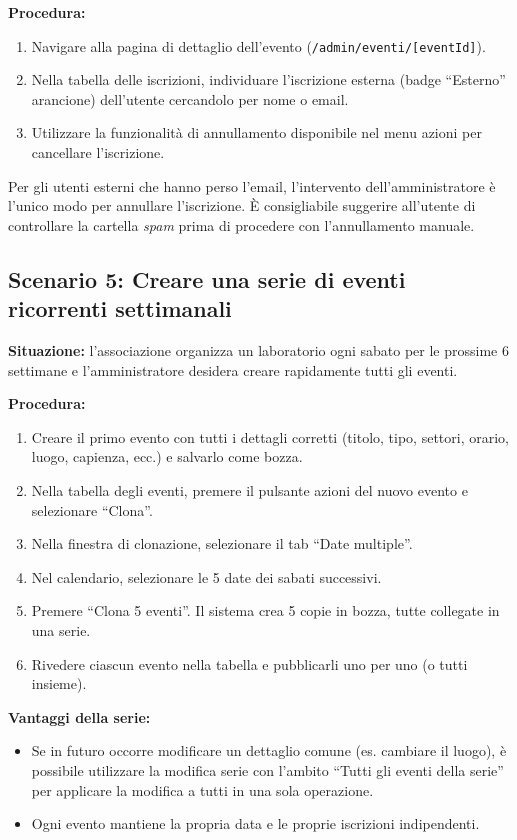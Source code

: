 \documentclass[a4paper,11pt,oneside]{book}
\newcommand{\percorso}[1]{\textcolor{namoCyan}{\texttt{#1}}}
\begin{document}
\textbf{Procedura:}
\begin{enumerate}[leftmargin=1.5em]
  \item Navigare alla pagina di dettaglio dell'evento (\percorso{/admin/eventi/[eventId]}).
  \item Nella tabella delle iscrizioni, individuare l'iscrizione esterna (badge ``Esterno'' arancione) dell'utente cercandolo per nome o email.
  \item Utilizzare la funzionalit\`a di annullamento disponibile nel menu azioni per cancellare l'iscrizione.
\end{enumerate}

\begin{tipbox}
Per gli utenti esterni che hanno perso l'email, l'intervento dell'amministratore \`e l'unico modo per annullare l'iscrizione. \`E consigliabile suggerire all'utente di controllare la cartella \textit{spam} prima di procedere con l'annullamento manuale.
\end{tipbox}

\subsection{Scenario 5: Creare una serie di eventi ricorrenti settimanali}

\textbf{Situazione:} l'associazione organizza un laboratorio ogni sabato per le prossime 6 settimane e l'amministratore desidera creare rapidamente tutti gli eventi.

\textbf{Procedura:}
\begin{enumerate}[leftmargin=1.5em]
  \item Creare il primo evento con tutti i dettagli corretti (titolo, tipo, settori, orario, luogo, capienza, ecc.) e salvarlo come bozza.
  \item Nella tabella degli eventi, premere il pulsante azioni del nuovo evento e selezionare ``Clona''.
  \item Nella finestra di clonazione, selezionare il tab ``Date multiple''.
  \item Nel calendario, selezionare le 5 date dei sabati successivi.
  \item Premere ``Clona 5 eventi''. Il sistema crea 5 copie in bozza, tutte collegate in una serie.
  \item Rivedere ciascun evento nella tabella e pubblicarli uno per uno (o tutti insieme).
\end{enumerate}

\textbf{Vantaggi della serie:}
\begin{itemize}[leftmargin=1.5em]
  \item Se in futuro occorre modificare un dettaglio comune (es. cambiare il luogo), \`e possibile utilizzare la modifica serie con l'ambito ``Tutti gli eventi della serie'' per applicare la modifica a tutti in una sola operazione.
  \item Ogni evento mantiene la propria data e le proprie iscrizioni indipendenti.
\end{itemize}
\end{document}
